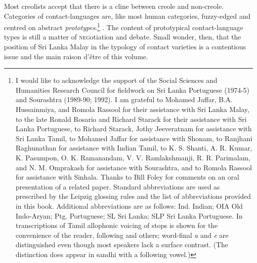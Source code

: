 Most creolists accept that there is a cline between creole and non-creole. Categories of contact-languages are, like most human categories, fuzzy-edged and centred on abstract \textit{prototypes}.\footnote{I
 would like to acknowledge the support of the Social Sciences and Humanities Research Council for fieldwork on Sri Lanka Portuguese (1974-5) and Sourashtra (1989-90; 1992). I am grateful to Mohamed Jaffar, B.A. Hussainmiya, and Romola Rassool for their assistance with Sri Lanka Malay, to the late Ronald Rosario and Richard Starack for their assistance with Sri Lanka Portuguese, to Richard Starack, Jothy Jeeveratnam for assistance with Sri Lanka Tamil, to Mohamed Jaffar for assistance with Shonam, to Ranjhani Raghunathan for assistance with Indian Tamil, to K. S. Shanti, A. R. Kumar, K. Pasumpon, O. K. Ramanandam, V. V. Ramlakshmanji, R. R. Parimalam, and N. M. Omprakash for assistance with Sourashtra, and to Romola Rassool for assistance with Sinhala. Thanks to Bill Foley for comments on an oral presentation of a related paper. 
 Standard abbreviations are used as prescribed by the Leipzig glossing rules and the list of abbreviations provided in this book.
Additional abbreviations are as follows: 
 Ind. Indian; 
 OIA Old Indo-Aryan; 
 Ptg. Portuguese; 
 SL Sri Lanka; 
 SLP Sri Lanka Portuguese. 
 In transcriptions of Tamil allophonic voicing of stops is shown for the convenience of the reader, following \citet{Schiffman1999} and others; word-final \textit{a} and \textit{e} are distinguished even though most speakers lack a surface contrast. (The distinction does appear in sandhi with a following vowel.)
}
\citep{Rosch1975,Rosch1978,Thomason1997,Smith2005prototype}. The content of prototypical contact-language types is still a matter of \textsc{neg}otiation and debate. Small wonder, then, that the position of Sri Lanka Malay in the typology of contact varieties is a contentious issue and the main raison d'\^etre of this volume. 

